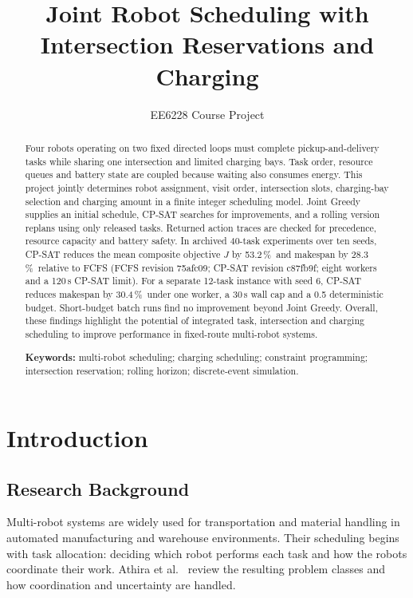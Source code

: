 \documentclass[11pt,a4paper]{article}
\title{\textbf{Joint Robot Scheduling with Intersection Reservations and Charging}}
\author{EE6228 Course Project}
\date{}
\newcommand{\pct}{\,\%}
\begin{document}
\maketitle

\begin{abstract}
\noindent Four robots operating on two fixed directed loops must complete pickup-and-delivery tasks
while sharing one intersection and limited charging bays. Task order, resource queues and battery
state are coupled because waiting also consumes energy. This project jointly determines robot
assignment, visit order, intersection slots, charging-bay selection and charging amount in a finite
integer scheduling model. Joint Greedy supplies an initial schedule, CP-SAT searches for improvements,
and a rolling version replans using only released tasks. Returned action traces are checked for
precedence, resource capacity and battery safety. In archived 40-task experiments over ten seeds,
CP-SAT reduces the mean composite objective $J$ by 53.2\pct\ and makespan by 28.3\pct\ relative to
FCFS (FCFS revision 75afc09; CP-SAT revision c87fb9f; eight workers and a 120\,s CP-SAT limit). For a
separate 12-task instance with seed 6, CP-SAT reduces makespan by 30.4\pct\ under one worker, a 30\,s
wall cap and a 0.5 deterministic budget. Short-budget batch runs find no improvement beyond Joint
Greedy. Overall, these findings highlight the potential of integrated task, intersection and charging
scheduling to improve performance in fixed-route multi-robot systems.

\medskip\noindent\textbf{Keywords:} multi-robot scheduling; charging scheduling; constraint
programming; intersection reservation; rolling horizon; discrete-event simulation.
\end{abstract}

\section{Introduction}

\subsection{Research Background}

Multi-robot systems are widely used for transportation and material handling in automated
manufacturing and warehouse environments. Their scheduling begins with task allocation: deciding which
robot performs each task and how the robots coordinate their work. Athira et al.~\cite{athira2025mrta}
review the resulting problem classes and how coordination and uncertainty are handled.
\end{document}
